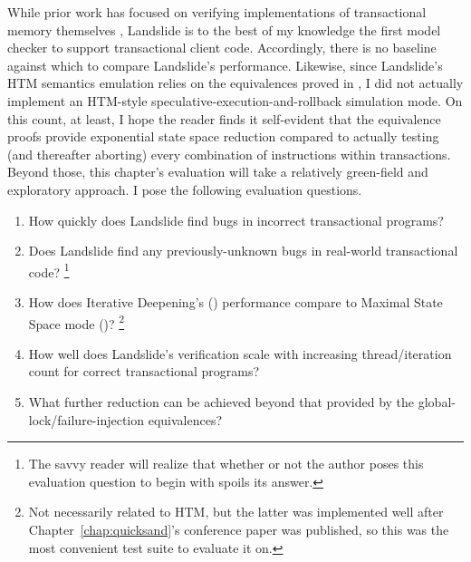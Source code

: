 While prior work has focused on verifying implementations of transactional memory themselves
\cite{specifying-verifying-tm,tm-correctness,tm-completeness,mc-tm-with-spin},
Landslide is to the best of my knowledge the first model checker to support transactional client code.
Accordingly, there is no baseline against which to compare Landslide's performance.
Likewise, since Landslide's HTM semantics emulation relies on the equivalences proved in \sect{\ref{sec:tm-design}},
I did not actually implement an HTM-style speculative-execution-and-rollback simulation mode.
On this count, at least,
I hope the reader finds it self-evident that
the equivalence proofs provide exponential state space reduction
compared to actually testing (and thereafter aborting) every combination of instructions within transactions.
Beyond those, this chapter's evaluation will take a relatively green-field and exploratory approach.
I pose the following evaluation questions.


\begin{enumerate}
	\item How quickly does Landslide find bugs in incorrect transactional programs? %
	\item Does Landslide find any previously-unknown bugs in real-world transactional code?%
		\footnote{The savvy reader will realize that whether or not the author poses this evaluation question to begin with spoils its answer.}
	\item How does Iterative Deepening's (\sect{\ref{sec:quicksand-id}})
		performance compare to Maximal State Space mode (\sect{\ref{sec:landslide-quicksand-options}})?%
		\footnote{Not necessarily related to HTM,
		but the latter was implemented well after Chapter~\ref{chap:quicksand}'s conference paper was published,
		so this was the most convenient test suite to evaluate it on.}
	\item How well does Landslide's verification scale
		with increasing thread/iteration count for correct transactional programs?
	\item What further reduction can be achieved beyond that provided by
		the global-lock/failure-injection equivalences?
\end{enumerate}

